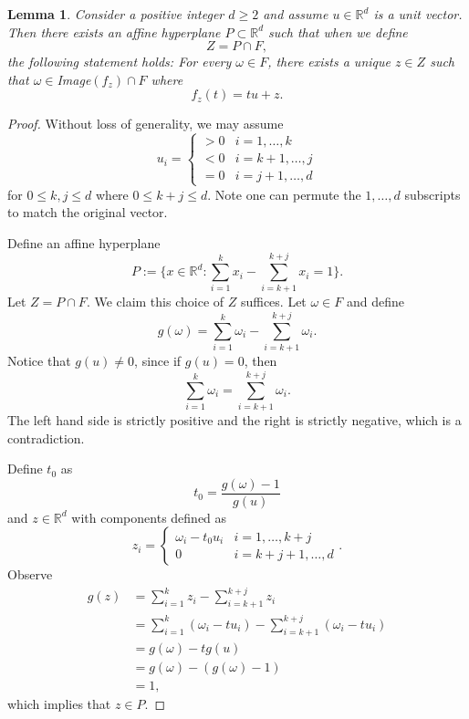 \documentclass{amsart}
\newtheorem{lemma}{Lemma}
\newcommand{\RR}{\mathbb{R}}
\begin{document}
\begin{lemma}\label{l.hyperplane}
    Consider a positive integer $d\geq 2$ and assume $u\in\RR^d$ is a unit vector. Then there exists an affine hyperplane $P\subset \RR^d$ such that when we define
    \[Z = P \cap F,\]
    the following statement holds: For every $\omega\in F$, there exists a unique $z\in Z$ such that $\omega\in $Image$(f_z)\cap F$ where
    \[f_z(t) = tu + z.\]
\end{lemma}
\begin{proof}
    Without loss of generality, we may assume
    \[u_i = \begin{cases}
        > 0 & i = 1,\dots, k\\
        < 0 & i = k+1, \dots, j\\
        = 0 & i = j+1, \dots, d
    \end{cases}\]
    for $0\leq k,j\leq d$ where $0\leq k + j \leq d$. Note one can permute the $1,\dots, d$ subscripts to match the original vector. 

    Define an affine hyperplane 
    \[P:= \{x\in \RR^d: \sum_{i=1}^k x_i - \sum_{i=k+1}^{k+j} x_i = 1\}.\]
    Let $Z = P\cap F$. We claim this choice of $Z$ suffices. Let $\omega\in F$ and define
    \[g(\omega)= \sum_{i=1}^k \omega_i - \sum_{i=k+1}^{k+j} \omega_i.\]
    Notice that $g(u) \neq 0$, since if $g(u) = 0$, then 
    \[\sum_{i=1}^k \omega_i = \sum_{i=k+1}^{k+j} \omega_i.\]
    The left hand side is strictly positive and the right is strictly negative, which is a contradiction. 

    Define $t_0$ as
    \[t_0 = \frac{g(\omega) - 1}{g(u)}\]
    and $z \in \RR^d$ with components defined as
    \[z_i = \begin{cases}
        \omega_i -t_0u_i & i = 1,\dots, k+j\\
        0 & i = k+j + 1, \dots, d
    \end{cases}.\]
    Observe
    \begin{align*}
        g(z) &= \sum_{i=1}^k z_i - \sum_{i=k+1}^{k+j} z_i\\
        &= \sum_{i=1}^k (\omega_i -tu_i) - \sum_{i=k+1}^{k+j} (\omega_i -tu_i)\\
        &= g(\omega) - tg(u)\\
        &= g(\omega) - (g(\omega)-1)\\
        &= 1,
    \end{align*}
    which implies that $z\in P$. 
    

\end{proof}
\end{document}
